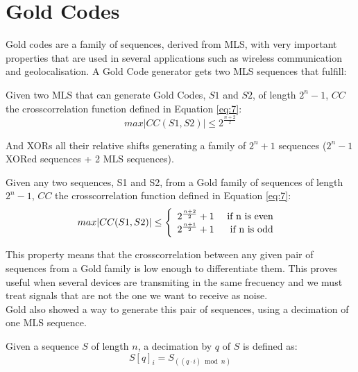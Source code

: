 \section{Gold Codes}

Gold codes\cite{gold_codes} are a family of sequences, derived from MLS, with
very important properties that are used in several applications such as wireless
communication and geolocalisation. A Gold Code generator gets two MLS sequences
that fulfill:

\begin{property}
  Given two MLS that can generate Gold Codes, $S1$ and $S2$, of length $2^{n}-
  1$, $CC$ the crosscorrelation function defined in Equation \ref{eq:7}:
    \begin{equation}\label{gold:eq:1}
      max |CC(S1, S2)| \leq 2^{\frac{n+2}{2}}
    \end{equation}
\end{property}

And XORs all their relative shifts generating a family of $2^{n} + 1$ sequences
($2^{n} - 1$ XORed sequences + 2 MLS sequences).

\begin{property}
  Given any two sequences, S1 and S2, from a Gold family of sequences of length
  $2^{n}-1$, $CC$ the crosscorrelation function defined in Equation \ref{eq:7}:
  \begin{equation}
        max |CC(S1, S2)| \leq \left\{\begin{array}{lr}
            2^{\frac{n+2}{2}}+1 & \textnormal{ if n is even } \\
            2^{\frac{n+1}{2}}+1 & \textnormal{ if n is odd } \\
        \end{array}\right.
  \end{equation}
\end{property}


This property means that the crosscorrelation between any given pair of
sequences from a Gold family is low enough to differentiate them. This proves
useful when several devices are transmiting in the same frecuency and we must
treat signals that are not the one we want to receive as noise.\\

Gold also showed  a way to generate this pair of sequences,
using a decimation of one MLS sequence.

\begin{definition}[Decimation]
  Given a sequence $S$ of length $n$, a decimation by $q$ of $S$ is defined as:
  \begin{equation}
    S[q]_{i} = S_{((q·i) \bmod n)}
  \end{equation}
\end{definition}

